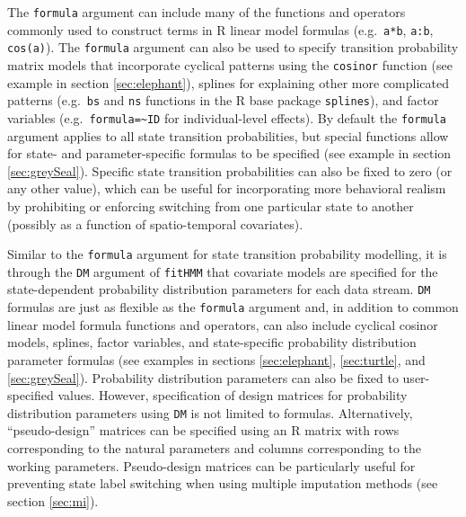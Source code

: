 \documentclass[12pt]{article}\usepackage[]{graphicx}\usepackage[]{color}
\begin{document}
The \verb|formula| argument can include many of the functions and operators commonly used to construct terms in R linear model formulas (e.g.\ \verb|a*b|, \verb|a:b|, \verb|cos(a)|). The \verb|formula| argument can also be used to specify transition probability matrix models that incorporate cyclical patterns using the \verb|cosinor| function (see example in section \ref{sec:elephant}), splines for explaining other more complicated patterns (e.g.\ \verb|bs| and \verb|ns| functions in the R base package \verb|splines|), and factor variables (e.g.\ \verb|formula=~ID| for individual-level effects).  By default the \verb|formula| argument applies to all state transition probabilities, but special functions allow for state- and parameter-specific formulas to be specified (see example in section \ref{sec:greySeal}). Specific state transition probabilities can also be fixed to zero (or any other value), which can be useful for incorporating more behavioral realism by prohibiting or enforcing switching from one particular state to another (possibly as a function of spatio-temporal covariates). 

Similar to the \verb|formula| argument for state transition probability modelling, it is through the \verb|DM| argument of \verb|fitHMM| that covariate models are specified for the state-dependent probability distribution parameters for each data stream.  %
\verb|DM| formulas are just as flexible as the \verb|formula| argument and, in addition to common linear model formula functions and operators, can also include cyclical cosinor models, splines, factor variables, and state-specific probability distribution parameter formulas (see examples in sections \ref{sec:elephant}, \ref{sec:turtle}, and \ref{sec:greySeal}). Probability distribution parameters can also be fixed to user-specified values.  However, specification of design matrices for probability distribution parameters using \verb|DM| is not limited to formulas. Alternatively, ``pseudo-design'' matrices can be specified using an R matrix with rows corresponding to the natural parameters and columns corresponding to the working parameters. %
Pseudo-design matrices can be particularly useful for preventing state label switching when using multiple imputation methods (see section \ref{sec:mi}).
\end{document}
